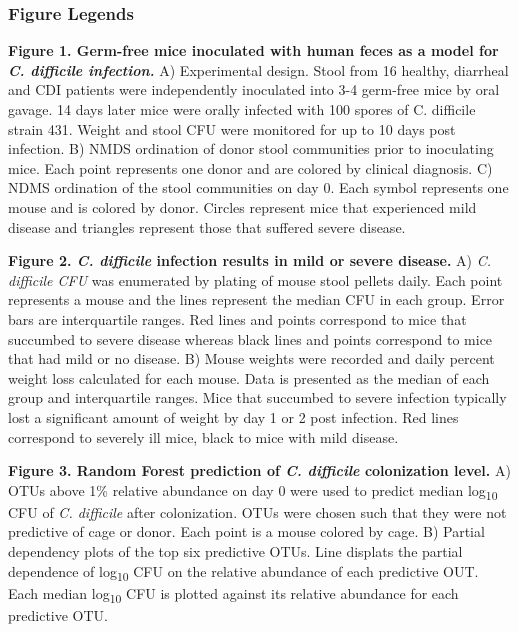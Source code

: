\documentclass[11pt,]{article}
\begin{document}
\newpage

\subsubsection{Figure Legends}\label{figure-legends}

\textbf{Figure 1. Germ-free mice inoculated with human feces as a model
for \emph{C. difficile infection.}} A) Experimental design. Stool from
16 healthy, diarrheal and CDI patients were independently inoculated
into 3-4 germ-free mice by oral gavage. 14 days later mice were orally
infected with 100 spores of C. difficile strain 431. Weight and stool
CFU were monitored for up to 10 days post infection. B) NMDS ordination
of donor stool communities prior to inoculating mice. Each point
represents one donor and are colored by clinical diagnosis. C) NDMS
ordination of the stool communities on day 0. Each symbol represents one
mouse and is colored by donor. Circles represent mice that experienced
mild disease and triangles represent those that suffered severe disease.

\textbf{Figure 2. \emph{C. difficile} infection results in mild or
severe disease.} A) \emph{C. difficile CFU} was enumerated by plating of
mouse stool pellets daily. Each point represents a mouse and the lines
represent the median CFU in each group. Error bars are interquartile
ranges. Red lines and points correspond to mice that succumbed to severe
disease whereas black lines and points correspond to mice that had mild
or no disease. B) Mouse weights were recorded and daily percent weight
loss calculated for each mouse. Data is presented as the median of each
group and interquartile ranges. Mice that succumbed to severe infection
typically lost a significant amount of weight by day 1 or 2 post
infection. Red lines correspond to severely ill mice, black to mice with
mild disease.

\textbf{Figure 3. Random Forest prediction of \emph{C. difficile}
colonization level.} A) OTUs above 1\% relative abundance on day 0 were
used to predict median log\textsubscript{10} CFU of \emph{C. difficile}
after colonization. OTUs were chosen such that they were not predictive
of cage or donor. Each point is a mouse colored by cage. B) Partial
dependency plots of the top six predictive OTUs. Line displats the
partial dependence of log\textsubscript{10} CFU on the relative
abundance of each predictive OUT. Each median log\textsubscript{10} CFU
is plotted against its relative abundance for each predictive OTU.
\end{document}
